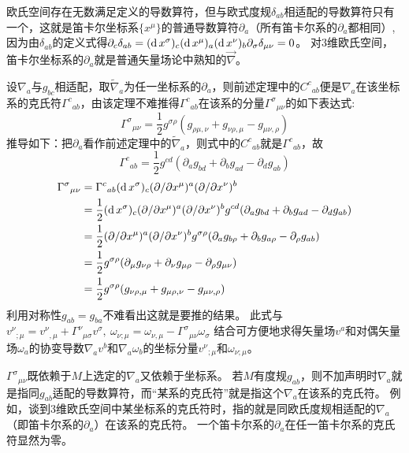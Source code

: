 \begin{example}
欧氏空间存在无数满足定义的导数算符，但与欧式度规$\delta_{ab}$相适配的导数算符只有一个，这就是笛卡尔坐标系$\{x^\mu\}$的普通导数算符$\partial_a$（所有笛卡尔系的$\partial_a$都相同）,因为由$\delta_{ab}$的定义式得$\partial_c\delta_{ab} = (\operatorname{d} x^\sigma)_c(\operatorname{d} x^\mu)_a(\operatorname{d} x^\nu)_b\partial_\sigma\delta_{\mu\nu} = 0$。
对$3$维欧氏空间，笛卡尔坐标系的$\partial_a$就是普通矢量场论中熟知的$\vec{\nabla}$。
\end{example}

设$\nabla_a$与$g_{bc}$相适配，取$\tilde\nabla_a$为任一坐标系的$\partial_a$，则前述定理中的$C^c{}_{ab}$便是$\nabla_a$在该坐标系的克氏符$\Gamma^c{}_{ab}$，由该定理不难推得$\Gamma^c{}_{ab}$在该系的分量$\Gamma^\sigma{}_{\mu\nu}$的如下表达式:
$$\Gamma^\sigma{}_{\mu\nu} = \frac{1}{2}g^{\sigma\rho}(g_{\rho\mu,\nu} + g_{\nu\rho,\mu} - g_{\mu\nu,\rho})$$
推导如下：把$\partial_a$看作前述定理中的$\tilde\nabla_a$，则式中的$C^c{}_{ab}$就是$\Gamma^c{}_{ab}$，故
$$\Gamma^c{}_{ab} = \frac{1}{2}g^{cd}(\partial_ag_{bd} + \partial_bg_{ad} - \partial_dg_{ab})$$
$$\begin{aligned}
\Gamma^\sigma{}_{\mu\nu} & = \Gamma^c{}_{ab}(\operatorname{d} x^\sigma)_c(\partial / \partial x^\mu)^a(\partial / \partial x^\nu)^b \\
& = \frac{1}{2}(\operatorname{d} x^\sigma)_c(\partial / \partial x^\mu)^a(\partial / \partial x^\nu)^bg^{cd}(\partial_ag_{bd} + \partial_bg_{ad} - \partial_dg_{ab}) \\
& = \frac{1}{2}(\partial / \partial x^\mu)^a(\partial / \partial x^\nu)^bg^{\sigma\rho}(\partial_ag_{b\rho} + \partial_bg_{a\rho} - \partial_\rho g_{ab}) \\
& = \frac{1}{2}g^{\sigma\rho}(\partial_\mu g_{\nu\rho} + \partial_\nu g_{\mu\rho} - \partial_\rho g_{\mu\nu}) \\
& = \frac{1}{2}g^{\sigma\rho}(g_{\nu\rho,\mu} + g_{\mu\rho,\nu} - g_{\mu\nu,\rho})
\end{aligned}$$
利用对称性$g_{ab} = g_{ba}$不难看出这就是要推的结果。
此式与
$v^\nu{}_{;\mu} = v^\nu{}_{,\mu} + \Gamma^\nu{}_{\mu\sigma}v^\sigma, ~ \omega_{\nu;\mu} = \omega_{\nu,\mu} - \Gamma^\sigma{}_{\mu\nu}\omega_\sigma$
结合可方便地求得矢量场$v^a$和对偶矢量场$\omega_a$的协变导数$\nabla_av^b$和$\nabla_a\omega_b$的坐标分量$v^\nu{}_{;\mu}$和$\omega_{\nu;\mu}$。

\begin{note}
$\Gamma^\sigma{}_{\mu\nu}$既依赖于$M$上选定的$\nabla_a$又依赖于坐标系。
若$M$有度规$g_{ab}$，则不加声明时$\nabla_a$就是指同$g_{ab}$适配的导数算符，而``某系的克氏符''就是指这个$\nabla_a$在该系的克氏符。
例如，谈到$3$维欧氏空间中某坐标系的克氏符时，指的就是同欧氏度规相适配的$\nabla_a$（即笛卡尔系的$\partial_a$）在该系的克氏符。
一个笛卡尔系的$\partial_a$在任一笛卡尔系的克氏符显然为零。
\end{note}

